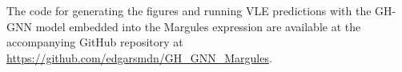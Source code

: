 The code for generating the figures and running VLE predictions with the GH-GNN model embedded into the Margules expression are available at the accompanying GitHub repository at \url{https://github.com/edgarsmdn/GH_GNN_Margules}.
